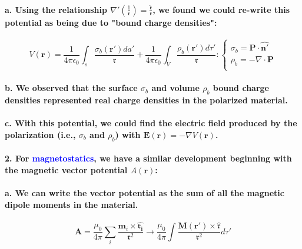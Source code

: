 \documentclass{article}
\begin{document}
\paragraph{\indent a. Using the relationship $\nabla'(\frac{1}{\mathfrak{r}})=\frac{\hat{\boldsymbol{\mathfrak{r}}}}{\mathfrak{r}}$, we found we could re-write this potential as being due to "bound charge densities":}
\begin{equation*}
    V(\boldsymbol{r})=\frac{1}{4\pi\epsilon_0}\int_s\frac{\sigma_b(\boldsymbol{r}')da'}{\mathfrak{r}}+\frac{1}{4\pi\epsilon_0}\int_V\frac{\rho_b(\boldsymbol{r}')d\tau'}{\mathfrak{r}}:\begin{cases}
        \sigma_b=\boldsymbol{P\cdot\hat{\boldsymbol{n}'}}\\
        \rho_b=-\nabla\cdot\boldsymbol{P}\\
    \end{cases}
\end{equation*}
\paragraph{\indent b. We observed that the surface $\sigma_b$ and volume $\rho_b$ bound charge densities represented real charge densities in the polarized material.}
\paragraph{\indent c. With this potential, we could find the electric field produced by the polarization (i.e., $\sigma_b$ and $\rho_b$) with $\boldsymbol{E}(\boldsymbol{r})=-\nabla V(\boldsymbol{r})$.}
\paragraph{2. For \textcolor{blue}{magnetostatics}, we have a similar development beginning with the magnetic vector potential $A(\boldsymbol{r})$:}
\paragraph{\indent a. We can write the vector potential as the sum of all the magnetic dipole moments in the material.}
\begin{equation*}
    \boldsymbol{A}=\frac{\mu_0}{4\pi}\sum_{i}\frac{\boldsymbol{m}_i\times\hat{\boldsymbol{\mathfrak{r}_i}}}{\mathfrak{r}^2}\rightarrow\frac{\mu_0}{4\pi}\int\frac{\boldsymbol{M}(\boldsymbol{r}')\times\hat{\boldsymbol{\mathfrak{r}}}}{\mathfrak{r}^2}d\tau'
\end{equation*}
\end{document}
